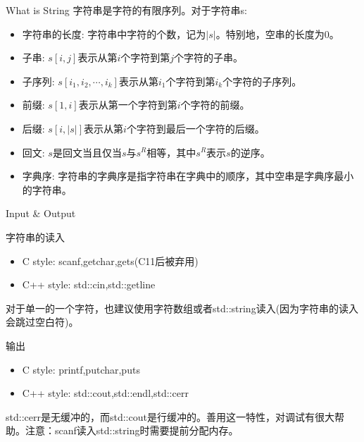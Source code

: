 \documentclass{ldr-simple-gray}
\begin{document}
  \begin{frame}{What is String}
    字符串是字符的有限序列。对于字符串s:
    \begin{itemize}
      \item 字符串的长度: 字符串中字符的个数，记为$|s|$。特别地，空串的长度为0。
      \item 子串: $s[i,j]$表示从第$i$个字符到第$j$个字符的子串。
      \item 子序列: $s[i_1,i_2,\cdots,i_k]$表示从第$i_1$个字符到第$i_k$个字符的子序列。
      \item 前缀: $s[1,i]$表示从第一个字符到第$i$个字符的前缀。
      \item 后缀: $s[i,|s|]$表示从第$i$个字符到最后一个字符的后缀。
      \item 回文: $s$是回文当且仅当$s$与$s^R$相等，其中$s^R$表示$s$的逆序。
      \item 字典序: 字符串的字典序是指字符串在字典中的顺序，其中空串是字典序最小的字符串。
    \end{itemize}
  \end{frame}

  \begin{frame}{Input \& Output}
    \begin{block}{字符串的读入}
      \begin{itemize}
        \item C style: scanf,getchar,gets(C11后被弃用)
        \item C++ style: std::cin,std::getline
      \end{itemize}
    \end{block}
    对于单一的一个字符，也建议使用字符数组或者std::string读入(因为字符串的读入会跳过空白符)。
    \begin{block}{输出}
      \begin{itemize}
        \item C style: printf,putchar,puts
        \item C++ style: std::cout,std::endl,std::cerr
      \end{itemize}
    \end{block}
    std::cerr是无缓冲的，而std::cout是行缓冲的。善用这一特性，对调试有很大帮助。注意：scanf读入std::string时需要提前分配内存。
  \end{frame}
  
\end{document}
